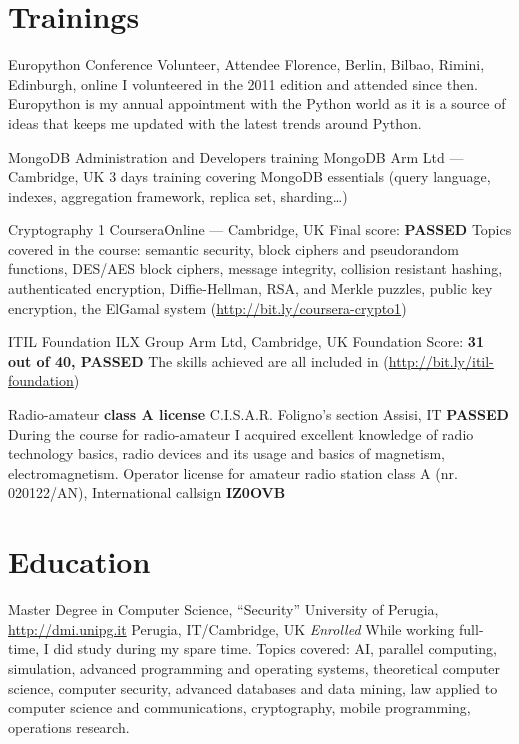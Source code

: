 \documentclass[10pt,a4paper,sans]{moderncv}
\begin{document}
\section{Trainings}
    {Europython Conference}
    {Volunteer, Attendee}
    {Florence, Berlin, Bilbao, Rimini, Edinburgh, online}
    {}
    {I volunteered in the 2011 edition and attended since then.
    Europython is my annual appointment with the Python world as it is
    a source of ideas that keeps me updated with the latest trends around
    Python.}

    {MongoDB Administration and Developers training}
    {MongoDB}
    {Arm Ltd --- Cambridge, UK}{}
    {3 days training covering MongoDB essentials (query language, indexes,
    aggregation framework, replica set, sharding\dots)}

    {Cryptography 1}
    {Coursera}{Online --- Cambridge, UK}
    {Final score: \textbf{PASSED}}
    {Topics covered in the course: semantic security, block ciphers and
    pseudorandom functions, DES/AES block ciphers, message integrity,
    collision resistant hashing, authenticated encryption, Diffie-Hellman, RSA,
    and Merkle puzzles, public key encryption, the ElGamal system
    (\url{http://bit.ly/coursera-crypto1})}

    {ITIL Foundation}
    {ILX Group}{
    Arm Ltd, Cambridge, UK}
    {Foundation Score: \textbf{31 out of 40, PASSED}}
    {The skills achieved are all included in
    (\url{http://bit.ly/itil-foundation})}

    {Radio-amateur \textbf{class A license}}
    {C.I.S.A.R. Foligno's section}
    {Assisi, IT}
    {\textbf{PASSED}}
    {During the course for radio-amateur I acquired excellent knowledge of
    radio technology basics, radio devices and its usage and basics of
    magnetism, electromagnetism. Operator license for amateur radio station
    class A (nr. 020122/AN), International callsign \textbf{IZ0OVB}}

\section{Education}
    {Master Degree in Computer Science, ``Security''}
    {University of Perugia, \url{http://dmi.unipg.it}}
    {Perugia, IT/Cambridge, UK}
    {\textit{Enrolled}}
    {While working full-time, I did study during my spare time. Topics covered:
    AI, parallel computing, simulation, advanced programming and operating
    systems, theoretical computer science, computer security, advanced
    databases and data mining, law applied to computer science and
    communications, cryptography, mobile programming, operations research.}
\end{document}
